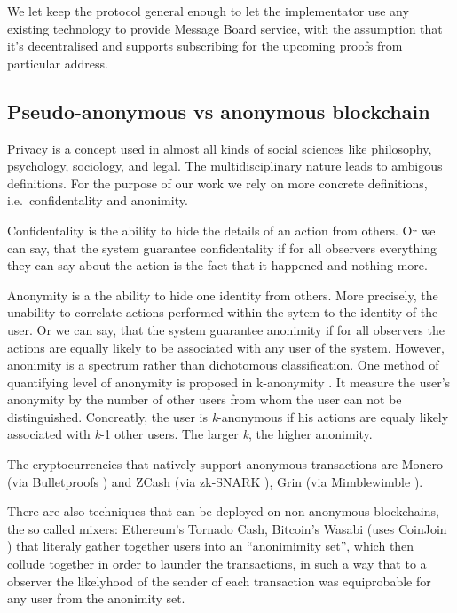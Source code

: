 \documentclass{ieeeaccess}
\begin{document}
We let keep the protocol general enough to let the implementator use any
existing technology to provide Message Board service, with the
assumption that it's decentralised and supports subscribing for the
upcoming proofs from particular address.



\subsection{Pseudo-anonymous vs anonymous blockchain}
Privacy is a concept used in almost all kinds of social sciences like
philosophy, psychology, sociology, and legal. The multidisciplinary
nature leads to ambigous definitions\cite{smith2011information}. For
the purpose of our work we rely on more concrete definitions,
i.e.~confidentality and anonimity.

Confidentality is the ability to hide the details of an action from
others. Or we can say, that the system guarantee confidentality if for
all observers everything they can say about the action is the fact that
it happened and nothing more.

Anonymity is a the ability to hide one identity from others. More
precisely, the unability to correlate actions performed within the sytem
to the identity of the user. Or we can say, that the system guarantee
anonimity if for all observers the actions are equally likely to be
associated with any user of the system. However, anonimity is a spectrum
rather than dichotomous classification. One method of quantifying level
of anonymity is proposed in k-anonymity \cite{sweeney2002k}. It measure
the user's anonymity by the number of other users from whom the user can
not be distinguished. Concreatly, the user is \emph{k}-anonymous if his
actions are equaly likely associated with \emph{k}-1 other users. The
larger \emph{k}, the higher anonimity.

The cryptocurrencies that natively support anonymous transactions are
Monero \cite{van2013cryptonote} (via Bulletproofs
\cite{Bulletpr14, bunz2018bulletproofs}) and ZCash
\cite{sasson2014zerocash} (via zk-SNARK \cite{ben2013snarks}), Grin
\cite{fuchsbauer2019aggregate} (via Mimblewimble \cite{httpsdow19}).

There are also techniques that can be deployed on non-anonymous
blockchains, the so called mixers: Ethereum's Tornado
Cash\cite{pertsev2019tornado}, Bitcoin's Wasabi\cite{WasabiWa56} (uses
CoinJoin \cite{CoinJoin41}) that literaly gather together users into an
``anonimimity set'', which then collude together in order to launder the
transactions, in such a way that to a observer the likelyhood of the
sender of each transaction was equiprobable for any user from the
anonimity set.
\end{document}
